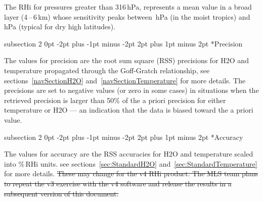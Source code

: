 \documentclass[11pt,draft]{report}
\makeatletter
\renewcommand{\subsection}{\@startsection%
  {subsection}%
  {2}%
  {0pt}%
  {-2pt plus -1pt minus -2pt}%
  {2pt plus 1pt minus 2pt}%
  {\large\sffamily\fontseries{sb}\selectfont\flushleft\color{SectionColor}\figureversion{tabular}}}%
\providecommand{\DIFdeltex}[1]{{\protect\color{red}\sout{#1}}}                      %
\providecommand{\DIFdelbegin}{} %
\providecommand{\DIFdelend}{} %
\providecommand{\DIFdel}[1]{\texorpdfstring{\DIFdeltex{#1}}{}} %
\makeatother
\begin{document}
The RHi for pressures greater than 316\,hPa, represents a mean value in
a broad layer (4\,--\,6\,km) whose sensitivity peaks between
\,hPa (in the moist tropics) and \,hPa
(typical for dry high latitudes).

\subsection*{Precision}

The values for precision are the root sum square (RSS) precisions for
H\cs2O and temperature propagated through the Goff-Gratch relationship,
see sections~\ref{navSectionH2O} and~\ref{navSectionTemperature} for
more details. The precisions are set to negative values (or zero in some
cases) in situations when the retrieved precision is larger than 50\% of
the a priori precision for either temperature or H\cs2O --- an
indication that the data is biased toward the a priori value.

\subsection*{Accuracy}

The values for accuracy are the RSS accuracies for H\cs2O and
temperature scaled into \%\,RHi units. see
sections~\ref{sec:StandardH2O} and~\ref{sec:StandardTemperature} for
more details.
\DIFdelbegin \DIFdel{These may change for the v4 RHi product. The MLS team
plans to repeat the v3 exercise with the v4 software and release the
results in a subsequent version of this document.
}\DIFdelend 
\end{document}
